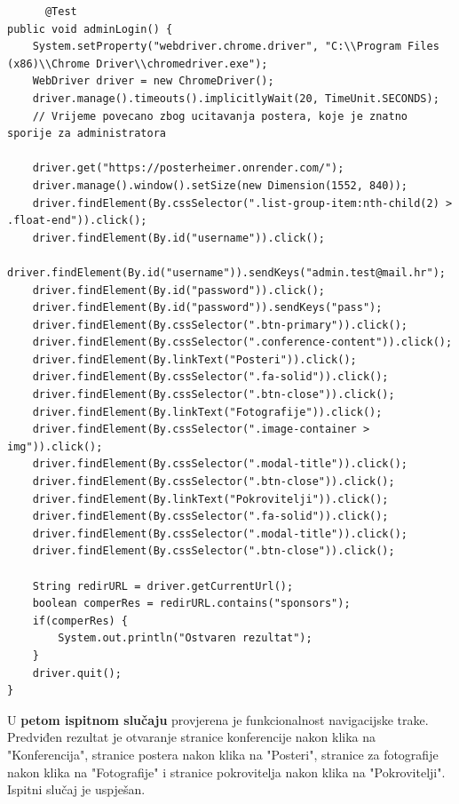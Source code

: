 			\begin{lstlisting}
	  @Test
public void adminLogin() {
	System.setProperty("webdriver.chrome.driver", "C:\\Program Files (x86)\\Chrome Driver\\chromedriver.exe");
	WebDriver driver = new ChromeDriver();
	driver.manage().timeouts().implicitlyWait(20, TimeUnit.SECONDS);
	// Vrijeme povecano zbog ucitavanja postera, koje je znatno sporije za administratora
	
	driver.get("https://posterheimer.onrender.com/");
	driver.manage().window().setSize(new Dimension(1552, 840));
	driver.findElement(By.cssSelector(".list-group-item:nth-child(2) > .float-end")).click();
	driver.findElement(By.id("username")).click();
	driver.findElement(By.id("username")).sendKeys("admin.test@mail.hr");
	driver.findElement(By.id("password")).click();
	driver.findElement(By.id("password")).sendKeys("pass");
	driver.findElement(By.cssSelector(".btn-primary")).click();
	driver.findElement(By.cssSelector(".conference-content")).click();
	driver.findElement(By.linkText("Posteri")).click();
	driver.findElement(By.cssSelector(".fa-solid")).click();
	driver.findElement(By.cssSelector(".btn-close")).click();
	driver.findElement(By.linkText("Fotografije")).click();
	driver.findElement(By.cssSelector(".image-container > img")).click();
	driver.findElement(By.cssSelector(".modal-title")).click();
	driver.findElement(By.cssSelector(".btn-close")).click();
	driver.findElement(By.linkText("Pokrovitelji")).click();
	driver.findElement(By.cssSelector(".fa-solid")).click();
	driver.findElement(By.cssSelector(".modal-title")).click();
	driver.findElement(By.cssSelector(".btn-close")).click();
	
	String redirURL = driver.getCurrentUrl();
	boolean comperRes = redirURL.contains("sponsors");
	if(comperRes) {
		System.out.println("Ostvaren rezultat");
	}
	driver.quit();
}
			\end{lstlisting}
			
			
	U \textbf{petom ispitnom slučaju} provjerena je funkcionalnost navigacijske trake. Predviđen rezultat je otvaranje stranice konferencije nakon klika na "Konferencija", stranice postera nakon klika na "Posteri", stranice za fotografije nakon klika na "Fotografije" i stranice pokrovitelja nakon klika na "Pokrovitelji". Ispitni slučaj je uspješan.
	
